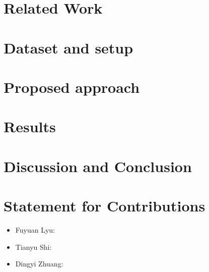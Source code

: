 \documentclass[11pt]{scrartcl}
\begin{document}
\section{Related Work}


\section{Dataset and setup}


\section{Proposed approach}


\section{Results}


\section{Discussion and Conclusion}

\section{Statement for Contributions}
\begin{itemize}
	\item Fuyuan Lyu: 
	\item Tianyu Shi: 
	\item Dingyi Zhuang: 
\end{itemize}
\newpage



\end{document}

